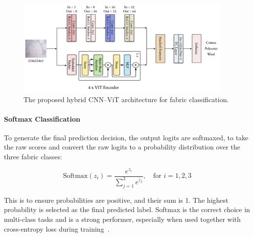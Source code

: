 \begin{figure}[ht]
    \centering
    \includegraphics[width=0.95\textwidth]{images/ModelDiagram.png}
    \caption{The proposed hybrid CNN–ViT architecture for fabric classification.}
    \label{fig:model-architecture}
\end{figure}

\paragraph{Softmax Classification}

To generate the final prediction decision, the output logits are softmaxed, to take the raw scores and convert the raw logits to a probability distribution over the three fabric classes:

\[
\text{Softmax}(z_i) = \frac{e^{z_i}}{\sum_{j=1}^{3} e^{z_j}}, \quad \text{for } i = 1,2,3
\]

This is to ensure probabilities are positive, and their sum is 1. The highest probability is selected as the final predicted label. Softmax is the correct choice in multi-class tasks and is a strong performer, especially when used together with cross-entropy loss during training~\cite{bishop2006pattern, goodfellow2016deep}.